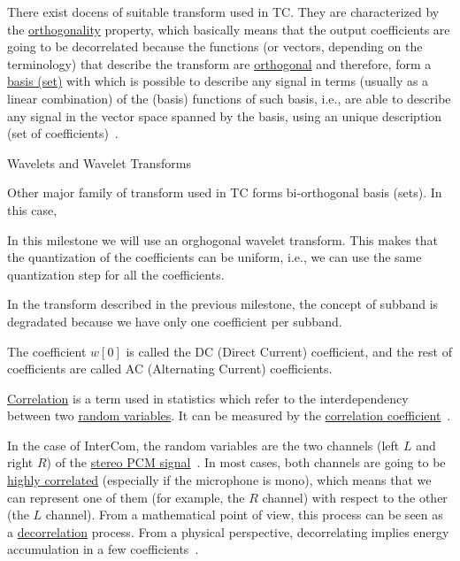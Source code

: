There exist docens of suitable transform used in TC. They are
characterized by the
\href{https://en.wikipedia.org/wiki/Orthogonality}{orthogonality}
property, which basically means that the output coefficients are going
to be decorrelated because the functions (or vectors, depending on the
terminology) that describe the transform are
\href{https://en.wikipedia.org/wiki/Orthogonal_functions}{orthogonal}
and therefore, form a
\href{https://en.wikipedia.org/wiki/Basis_(linear_algebra)}{basis
  (set)} with which is possible to describe any signal in terms
(usually as a linear combination) of the (basis) functions of such
basis, i.e., are able to describe any signal in the vector space
spanned by the basis, using an unique description (set of
coefficients)~\cite{}.

Wavelets and Wavelet Transforms

Other major family of transform used in TC forms bi-orthogonal basis
(sets). In this case,

In this milestone we will use an orghogonal wavelet transform. This
makes that the quantization of the coefficients can be uniform, i.e.,
we can use the same quantization step for all the coefficients.

In the transform described in the previous milestone, the concept of subband is degradated because we have only one coefficient per subband.

The coefficient $w[0]$ is called the DC (Direct Current) coefficient, and the rest of coefficients are called AC (Alternating Current) coefficients.

\href{https://en.wikipedia.org/wiki/Correlation_and_dependence}{Correlation}
is a term used in statistics which refer to the interdependency
between two \href{https://en.wikipedia.org/wiki/Random_variable}{random
  variables}. It can be measured by the
\href{https://www.mathsisfun.com/data/correlation.html}{correlation
  coefficient}~\cite{thinkstats}.

In the case of InterCom, the random variables are the two channels
(left $L$ and right $R$) of the
\href{https://en.wikipedia.org/wiki/Stereophonic_sound}{stereo
  \href{https://en.wikipedia.org/wiki/Pulse-code_modulation}{PCM}
  signal}~\cite{bosi2003intro}. In most cases, both channels are going
to be \href{https://en.wikipedia.org/wiki/Binaural_recording}{highly
  correlated} (especially if the microphone is mono), which means that
we can represent one of them (for example, the $R$ channel) with
respect to the other (the $L$ channel). From a mathematical point of
view, this process can be seen as a
\href{https://en.wikipedia.org/wiki/Decorrelation}{decorrelation}
process. From a physical perspective, decorrelating implies energy
accumulation in a few coefficients~\cite{sayood2017introduction}.


